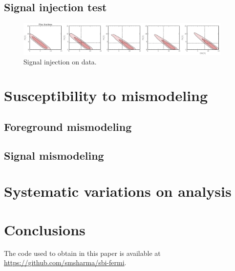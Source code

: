 \documentclass[prd,aps,10pt,nofootinbib,twocolumn,superscriptaddress,preprintnumbers,balancelastpage,longbibliography]{revtex4-1}
\begin{document}
\subsection{Signal injection test}
\label{sec:sig-injection}

%
\begin{figure}
    \centering
    \includegraphics[width=0.95\textwidth]{plots/data_sig_inj.pdf}
    \caption{Signal injection on data.}
    \label{fig:sig_inj_data}
\end{figure}
%

\section{Susceptibility to mismodeling}
\label{sec:mismodeling}

\subsection{Foreground mismodeling}
\label{sec:fg-mismodeling}

\subsection{Signal mismodeling}
\label{sec:sig-mismodeling}

\section{Systematic variations on analysis}
\label{sec:systematics}

\section{Conclusions}
\label{sec:conclusion}

The code used to obtain in this paper is available at \url{https://github.com/smsharma/sbi-fermi}.

\vspace{.3cm}
\end{document}
